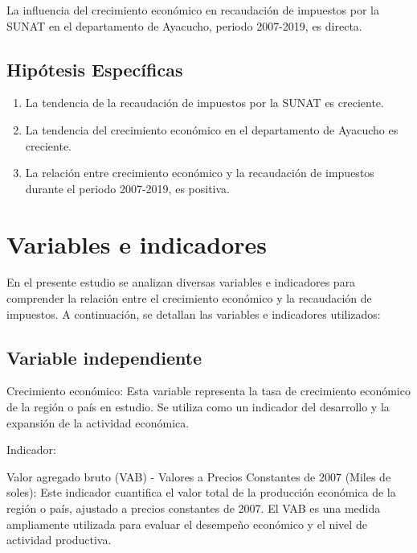 \documentclass[
  letterpaper,
  DIV=11,
  numbers=noendperiod]{scrartcl}
\begin{document}
La influencia del crecimiento económico en recaudación de impuestos por
la SUNAT en el departamento de Ayacucho, periodo 2007-2019, es directa.

\hypertarget{sec-hipuxf3tesis-especuxedficas}{%
\subsection{Hipótesis
Específicas}\label{sec-hipuxf3tesis-especuxedficas}}

\begin{enumerate}
\def\labelenumi{\arabic{enumi}.}
\item
  La tendencia de la recaudación de impuestos por la SUNAT es creciente.
\item
  La tendencia del crecimiento económico en el departamento de Ayacucho
  es creciente.
\item
  La relación entre crecimiento económico y la recaudación de impuestos
  durante el periodo 2007-2019, es positiva.
\end{enumerate}

\hypertarget{sec-variables-e-indicadores}{%
\section{Variables e indicadores}\label{sec-variables-e-indicadores}}

En el presente estudio se analizan diversas variables e indicadores para
comprender la relación entre el crecimiento económico y la recaudación
de impuestos. A continuación, se detallan las variables e indicadores
utilizados:

\hypertarget{sec-variable-independiente}{%
\subsection{Variable independiente}\label{sec-variable-independiente}}

Crecimiento económico: Esta variable representa la tasa de crecimiento
económico de la región o país en estudio. Se utiliza como un indicador
del desarrollo y la expansión de la actividad económica.

Indicador:

Valor agregado bruto (VAB) - Valores a Precios Constantes de 2007 (Miles
de soles): Este indicador cuantifica el valor total de la producción
económica de la región o país, ajustado a precios constantes de 2007. El
VAB es una medida ampliamente utilizada para evaluar el desempeño
económico y el nivel de actividad productiva.
\end{document}
